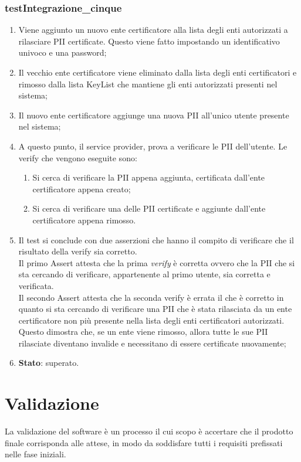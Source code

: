 \subsubsection{testIntegrazione\_cinque}
\begin{enumerate}
	\item Viene aggiunto un nuovo ente certificatore alla lista degli enti autorizzati a rilasciare \gls{PII} certificate. Questo viene fatto impostando un identificativo univoco e una password;
	\item Il vecchio ente certificatore viene eliminato dalla lista degli enti certificatori e rimosso dalla lista KeyList che mantiene gli enti autorizzati presenti nel sistema;
	\item Il nuovo ente certificatore aggiunge una nuova \gls{PII} all'unico utente presente nel sistema;
	\item A questo punto, il service provider, prova a verificare le \gls{PII} dell'utente. Le verify che vengono eseguite sono:
	\begin{enumerate}
		\item Si cerca di verificare la \gls{PII} appena aggiunta, certificata dall'ente certificatore appena creato;
		\item Si cerca di verificare una delle \gls{PII} certificate e aggiunte dall'ente certificatore appena rimosso.
	\end{enumerate}
	\item Il test si conclude con due asserzioni che hanno il compito di verificare che il risultato della verify sia corretto.\\
	Il primo Assert attesta che la prima \textit{verify} è corretta ovvero che la \gls{PII} che si sta cercando di verificare, appartenente al primo utente, sia corretta e verificata.\\
	Il secondo Assert attesta che la seconda verify è errata il che è corretto in quanto si sta cercando di verificare una \gls{PII} che è stata rilasciata da un ente certificatore non più presente nella lista degli enti certificatori autorizzati.\\
	Questo dimostra che, se un ente viene rimosso, allora tutte le sue \gls{PII} rilasciate diventano invalide e necessitano di essere certificate nuovamente;	
	\item \textbf{Stato}: superato.
\end{enumerate}
\section{Validazione}
La validazione del software è un processo il cui scopo è accertare che il prodotto finale corrisponda alle attese, in modo da soddisfare tutti i requisiti prefissati nelle fase iniziali.
